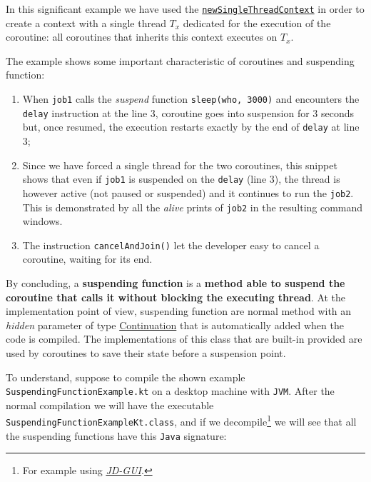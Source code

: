 In this significant example we have used the \href{https://kotlinlang.org/api/kotlinx.coroutines/kotlinx-coroutines-core/kotlinx.coroutines/new-single-thread-context.html}{\texttt{newSingleThreadContext}} in order to create a context with a single thread $T_x$ dedicated for the execution of the coroutine: all coroutines that inherits this context executes on $T_x$.

The example shows some important characteristic of \Kotlin coroutines and suspending function:
\begin{enumerate}
	\item When \texttt{job1} calls the \textit{suspend} function \texttt{sleep(who, 3000)} and encounters the \texttt{delay} instruction at the line $3$, coroutine goes into suspension for $3$ seconds but, once resumed, the execution restarts exactly by the end of \texttt{delay} at line $3$;
	
	\item Since we have forced a single thread for the two coroutines, this snippet shows that even if \texttt{job1} is suspended on the \texttt{delay} (line $3$), the thread is however active (not paused or suspended) and it continues to run the \texttt{job2}. This is demonstrated by all the \textit{alive} prints of \texttt{job2} in the resulting command windows.
	
	\item The instruction \texttt{cancelAndJoin()} let the developer easy to cancel a coroutine, waiting for its end.
\end{enumerate}

By concluding, a \textbf{suspending function} is a \Kotlin \textbf{method able to suspend the coroutine that calls it without blocking the executing thread}. At the implementation point of view, suspending function are normal method with an \textit{hidden} parameter of type \href{https://kotlinlang.org/api/latest/jvm/stdlib/kotlin.coroutines/-continuation/}{Continuation} that is automatically added when the code is compiled. The implementations of this class that are built-in provided are used by coroutines to save their state before a suspension point.

To understand, suppose to compile the shown example \texttt{SuspendingFunctionExample.kt} on a desktop machine with \texttt{JVM}. After the normal \Kotlin compilation we will have the executable \texttt{SuspendingFunctionExampleKt.class}, and if we decompile\footnote{For example using \href{https://java-decompiler.github.io/}{\textit{JD-GUI}}.} we will see that all the suspending functions have this \texttt{Java} signature:

